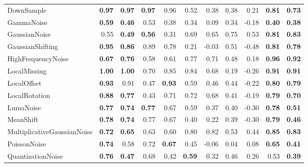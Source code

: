 \documentclass[acmsmall]{acmart}
\begin{document}
\begin{table}[htbp]
\begin{tiny}
\begin{tabular}{p{13.5em}|rr|rr|rr|rr|rr}
    \multicolumn{1}{l|}{DownSample} & \textbf{0.97}  & \textbf{0.97}  & \textbf{0.97}  & 0.96  & 0.52  & 0.38  & 0.38  & 0.21  & \textbf{0.81}  & \textbf{0.73}  \\
    \multicolumn{1}{l|}{GammaNoise} & \textbf{0.59}  & \textbf{0.46}  & 0.53  & 0.38  & 0.34  & 0.09  & 0.34  & -0.18  & \textbf{0.40}  & \textbf{0.38}  \\
    \multicolumn{1}{l|}{GaussianNoise} & 0.55  & \textbf{0.49}  & \textbf{0.56}  & 0.31  & 0.69  & 0.65  & 0.75  & 0.53  & \textbf{0.81}  & \textbf{0.83}  \\
    \multicolumn{1}{l|}{GaussianShifting} & \textbf{0.95}  & \textbf{0.86}  & 0.89  & 0.78  & 0.21  & -0.03  & 0.51  & -0.48  & \textbf{0.81}  & \textbf{0.78}  \\
    \multicolumn{1}{l|}{HighFrequencyNoise} & \textbf{0.67}  & \textbf{0.76}  & 0.58  & 0.61  & 0.77  & 0.71  & 0.48  & 0.18  & \textbf{0.96}  & \textbf{0.92}  \\
    \multicolumn{1}{l|}{LocalMissing} & \textbf{1.00}  & \textbf{1.00}  & 0.70  & 0.85  & 0.84  & 0.68  & 0.19  & -0.26  & \textbf{0.91}  & \textbf{0.91}  \\
    \multicolumn{1}{l|}{LocalOffset} & \textbf{0.93}  & 0.91  & 0.47  & \textbf{0.93}  & 0.59  & 0.46  & 0.44  & -0.22  & \textbf{0.80}  & \textbf{0.79}  \\
    \multicolumn{1}{l|}{LocalRotation} & \textbf{0.88}  & \textbf{0.77}  & 0.43  & 0.71  & 0.72  & 0.68  & 0.41  & -0.19  & \textbf{0.79}  & \textbf{0.70}  \\
    \multicolumn{1}{l|}{LumaNoise} & \textbf{0.77}  & \textbf{0.74}  & \textbf{0.77}  & 0.67  & 0.59  & 0.37  & 0.40  & -0.30  & \textbf{0.78}  & \textbf{0.51}  \\
    \multicolumn{1}{l|}{MeanShift} & \textbf{0.78}  & \textbf{0.74}  & 0.77  & 0.67  & 0.40  & 0.22  & 0.39  & -0.30  & \textbf{0.79}  & \textbf{0.46}  \\
    \multicolumn{1}{l|}{MultiplicativeGaussianNoise} & \textbf{0.72}  & \textbf{0.65}  & 0.63  & 0.60  & 0.80  & 0.82  & 0.53  & 0.44  & \textbf{0.85}  & \textbf{0.83}  \\
    \multicolumn{1}{l|}{PoissonNoise} & \textbf{0.74}  & 0.58  & 0.72  & \textbf{0.67}  & 0.45  & -0.06  & 0.04  & 0.08  & \textbf{0.65}  & \textbf{0.41}  \\
    \multicolumn{1}{l|}{QuantizationNoise} & \textbf{0.76}  & \textbf{0.47}  & 0.68  & 0.42  & \textbf{0.59}  & 0.32  & 0.46  & 0.26  & 0.53  & \textbf{0.39}  \\

\end{tabular}
\end{tiny}
\end{table}
\end{document}
